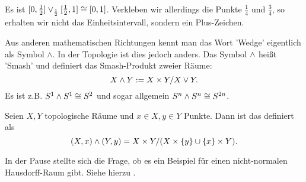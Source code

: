 \begin{example}
    Es ist $[0,\frac{1}{2}] \vee_{\frac{1}{2}} [\frac{1}{2},1] \cong [0,1]$. Verkleben wir allerdings die Punkte $\frac{1}{4}$ und $\frac{3}{4}$, so erhalten wir nicht das Einheitsintervall, sondern ein Plus-Zeichen.
\end{example}

\begin{remark*}
    Aus anderen mathematischen Richtungen kennt man das Wort 'Wedge' eigentlich als Symbol $\wedge$. In der Topologie ist dies jedoch anders. Das Symbol $\wedge$ heißt 'Smash' und definiert das Smash-Produkt zweier Räume:
     \[
    X \land Y := X \times  Y / X \vee Y
    .\]  
Es ist z.B. $S^1\wedge S^1 \cong S^2$ und sogar allgemein $S^n \wedge S^n \cong S^{2n}$.
\end{remark*}
\begin{definition*}\label{def:smash-produkt}
    Seien $X,Y$ topologische Räume und  $x\in X, y\in Y$ Punkte. Dann ist das  definiert als
    \[
        (X,x) \wedge (Y,y) = X\times Y / (X\times \left \{y\right\} \cup \left \{x\right\} \times Y)
    .\] 
\end{definition*}
\begin{remark*}
    In der Pause stellte sich die Frage, ob es ein Beispiel für einen nicht-normalen Hausdorff-Raum gibt. Siehe hierzu \cite[][Gegenbeispiel 86]{counterexamples}.
\end{remark*}

